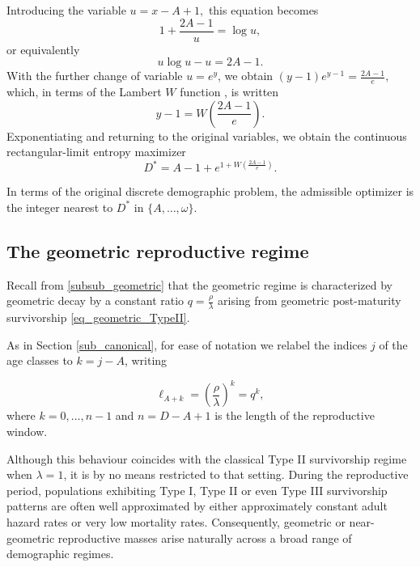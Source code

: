 \documentclass[10pt,a4paper]{amsart}
\theoremstyle{definition}
\theoremstyle{remark}
\numberwithin{equation}{section}
\begin{document}
\noindent Introducing the variable
$
u=x-A+1,
$ this 
equation becomes
\[
1+\frac{2A-1}{u}
=
\log u,
\]
or equivalently
\[
u\log u-u
=
2A-1.
\]
With the further change of variable \(u=e^y\), we obtain
$
(y-1)e^{y-1}
=
\frac{2A-1}{e},
$
which, in terms of the Lambert \(W\) function
\cite{Corless1996}, is written 
\[
y-1
=
W\!\left(
\frac{2A-1}{e}
\right).
\]
Exponentiating and returning to the original variables, we obtain
the continuous rectangular-limit entropy maximizer
\begin{equation}
\label{eq_Type_I_maximizer}
D^\ast
=
A-1+
e^{1+W\left(\frac{2A-1}{e}\right)}.
\end{equation}

In terms of the original discrete demographic problem, the admissible
optimizer is the integer nearest to $D^*$   in
$
\{A,\ldots,\omega\}.
$



\subsection{The geometric reproductive regime}

Recall from \ref{subsub_geometric} that the geometric regime is characterized by geometric decay by a constant ratio
$
q=\frac{\rho}{\lambda}
$
arising from geometric post-maturity survivorship
\eqref{eq_geometric_TypeII}. 




As in Section \ref{sub_canonical}, for ease of notation we relabel the indices $j$ of the age classes to $k=j-A$, writing

\begin{equation}
\ell_{A+k}
=
\left(
\frac{\rho}{\lambda}
\right)^k=q^k,
\label{eq:typeII_survivorshipA}
\end{equation}
where $k=0,\ldots,n-1$ and $n=D-A+1$ is the length of the reproductive window.

Although this behaviour coincides with the classical Type II
survivorship regime when $\lambda=1$, it is by no means restricted
to that setting. During the reproductive period, populations
exhibiting Type I, Type II or even Type III survivorship patterns
are often well approximated by either approximately constant adult
hazard rates or very low mortality rates. Consequently, geometric
or near-geometric reproductive masses arise naturally across
a broad range of demographic regimes.
\end{document}
